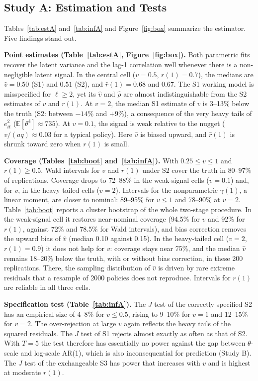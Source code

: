 \documentclass[mathematics,article,submit,moreauthors]{Definitions/mdpi}
\newcommand{\E}{\mathbb{E}}
\begin{document}
\subsection{Study A: Estimation and Tests}

Tables~\ref{tab:estA} and~\ref{tab:infA} and Figure~\ref{fig:box} summarize the estimator. Five findings stand out.

\textbf{Point estimates (Table~\ref{tab:estA}, Figure~\ref{fig:box}).} Both parametric fits recover the latent variance and the lag-1 correlation well whenever there is a non-negligible latent signal. In the central cell ($v=0.5$, $r(1)=0.7$), the medians are $\hat v=0.50$ (S1) and $0.51$ (S2), and $\hat r(1)=0.68$ and $0.67$. The S1 working model is misspecified for $\ell\ge2$, yet its $\hat v$ and $\hat\rho$ are almost indistinguishable from the S2 estimates of $v$ and $r(1)$. At $v=2$, the median S1 estimate of $v$ is 3--13\% below the truth (S2: between $-14\%$ and $+9\%$), a consequence of the very heavy tails of $e_{it}^2$ ($\E[\theta^4]\approx735$). At $v=0.1$, the signal is weak relative to the nugget ($v/(aq)\approx0.03$ for a typical policy). Here $\hat v$ is biased upward, and $\hat r(1)$ is shrunk toward zero when $r(1)$ is small.

\textbf{Coverage (Tables~\ref{tab:boot} and~\ref{tab:infA}).} With $0.25\le v\le1$ and $r(1)\ge0.5$, Wald intervals for $v$ and $r(1)$ under S2 cover the truth in 80--97\% of replications. Coverage drops to 72--88\% in the weak-signal cells ($v=0.1$) and, for $v$, in the heavy-tailed cells ($v=2$). Intervals for the nonparametric $\gamma(1)$, a linear moment, are closer to nominal: 89--95\% for $v\le1$ and 78--90\% at $v=2$. Table~\ref{tab:boot} reports a cluster bootstrap of the whole two-stage procedure. In the weak-signal cell it restores near-nominal coverage (94.5\% for $v$ and 92\% for $r(1)$, against 72\% and 78.5\% for Wald intervals), and bias correction removes the upward bias of $\hat v$ (median 0.10 against 0.15). In the heavy-tailed cell ($v=2$, $r(1)=0.9$) it does not help for $v$: coverage stays near 75\%, and the median $\hat v$ remains 18--20\% below the truth, with or without bias correction, in these 200 replications. There, the sampling distribution of $\hat v$ is driven by rare extreme residuals that a resample of 2000 policies does not reproduce. Intervals for $r(1)$ are reliable in all three cells.

\textbf{Specification test (Table~\ref{tab:infA}).} The $J$ test of the correctly specified S2 has an empirical size of 4--8\% for $v\le0.5$, rising to 9--10\% for $v=1$ and 12--15\% for $v=2$. The over-rejection at large $v$ again reflects the heavy tails of the squared residuals. The $J$ test of S1 rejects almost exactly as often as that of S2. With $T=5$ the test therefore has essentially no power against the gap between $\theta$-scale and log-scale AR(1), which is also inconsequential for prediction (Study B). The $J$ test of the exchangeable S3 has power that increases with $v$ and is highest at moderate $r(1)$.
\end{document}
